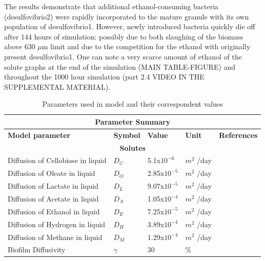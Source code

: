 The results demonstrate that additional ethanol-consuming bacteria (desulfovibrio2) were rapidly incorporated to the mature granule with its own population of desulfovibrio1. However, newly introduced bacteria quickly die off after 144 hours of simulation: possibly due to both slaughing of the biomass above 630 $\mu$m limit and due to the competition for the ethanol with originally present desulfovibrio1. One can note a very scarce amount of ethanol of the solute graphs at the end of the simulation (MAIN TABLE-FIGURE) and throughout the 1000 hour simulation (part 2.4 VIDEO IN THE SUPPLEMENTAL MATERIAL).


\begin{table}
\centering
\caption {Parameters used in model and their correspondent values}
\smallskip


	\def\arraystretch{1.1}%
	\setlength{\tabcolsep}{1em}
	\begin{tabular}{|p{6cm}|p{1.2cm}|p{1.4cm}|p{1.5cm}|p{3cm}|}
		\hline
		\multicolumn{5}{|c|}{	\textbf{Parameter Summary}} \\
		\hline
		\textbf{Model parameter   }  &	\textbf{Symbol } 	&	\textbf{ Value }& 	\textbf{Unit}& 	\textbf{References}\\
		\hline
		\multicolumn{5}{|c|}{	\textbf{Solutes}} \\
		\hline
		Diffusion of Cellobiose in liquid  &$ D_{C}	$    & 5.1x$10^{-6}$ &$m^{2}$ /day& \cite{}  \\ \cline{1-5}	
		Diffusion of Oleate in liquid	 &$ D_{O} $	& 2.85x$10^{-5}$ &$m^{2}$ /day&\cite{} \\ \cline{1-5}
		Diffusion of Lactate in liquid	 &$ D_{L} $	& 9.07x$10^{-5}$ &$m^{2}$ /day&\cite{} \\ \cline{1-5}
        Diffusion of Acetate in liquid	 &$ D_{A} $	& 1.05x$10^{-4}$ &$m^{2}$ /day&\cite{} \\ \cline{1-5}
        Diffusion of Ethanol in liquid	 &$ D_{E} $	& 7.25x$10^{-5}$ &$m^{2}$ /day&\cite{} \\ \cline{1-5}
        Diffusion of Hydrogen in liquid	 &$ D_{H} $	& 3.89x$10^{-4}$ &$m^{2}$ /day&\cite{} \\ \cline{1-5}
		Diffusion of Methane in liquid  & $D_{M}	$	& 1.29x$10^{-4}$ &$m^{2}$ /day& \cite{haynes2012CRC}\\  \cline{1-5}
		Biofilm Diffusivity  & $ \gamma	$	&	30 & \% & \cite{lens2003diffusional}\\ \cline{1-5}
		

\end{tabular}
\end{table}
